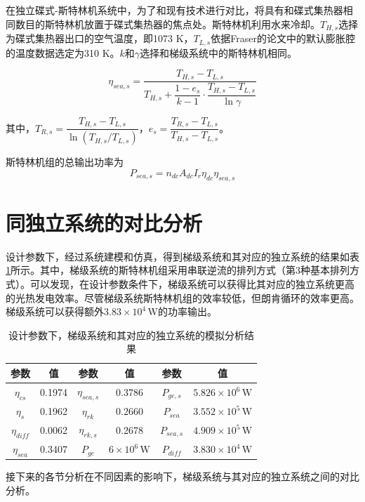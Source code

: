 在独立碟式-斯特林机系统中，为了和现有技术进行对比，将具有和碟式集热器相同数目的斯特林机放置于碟式集热器的焦点处。斯特林机利用水来冷却。$T_{H,s}$选择为碟式集热器出口的空气温度，即1073 K，$T_{L,s}$依据Fraser的论文\cite{Fraser2008}中的默认膨胀腔的温度数据选定为310 K。$k$和$\gamma$选择和梯级系统中的斯特林机相同。

\begin{equation}
	\eta_{sea,s}=\dfrac{T_{H,s}-T_{L,s}}{T_{H,s}+\dfrac{1-e_{s}}{k-1}\cdot\dfrac{T_{H,s}-T_{L,s}}{\ln\gamma}}
\end{equation}

其中，$T_{R,s}=\dfrac{T_{H,s}-T_{L,s}}{\ln(T_{H,s}/T_{L,s})}$，$e_{s}=\dfrac{T_{R,s}-T_{L,s}}{T_{H,s}-T_{L,s}}$。

斯特林机组的总输出功率为
\begin{equation}
	P_{sea,s}=n_{dc}A_{dc}I_r\eta_{dc}\eta_{sea,s}
\end{equation}

\section{同独立系统的对比分析}

设计参数下，经过系统建模和仿真，得到梯级系统和其对应的独立系统的结果如表\ref{tab:importantResults}所示。其中，梯级系统的斯特林机组采用串联逆流的排列方式（第3种基本排列方式）。可以发现，在设计参数条件下，梯级系统可以获得比其对应的独立系统更高的光热发电效率。尽管梯级系统斯特林机组的效率较低，但朗肯循环的效率更高。梯级系统可以获得额外$3.83\times10^4\,\mathrm{W}$的功率输出。

\begin{table}[htbp]
\setlength{\abovecaptionskip}{-10pt}
	\caption{设计参数下，梯级系统和其对应的独立系统的模拟分析结果}
	\begin{center}
	\begin{tabular}{cccccc}
		\toprule
		参数		&	值	&	参数		&	值	&	参数		&	值\\
		\midrule
		$\eta_{cs}$		&	0.1974	&	$\eta_{sea,s}$	&	0.3786	&	$P_{ge,s}$	&	$5.826\times10^6\,\mathrm{W}$\\
		$\eta_{s}$	&	0.1962	&	$\eta_{rk}$	&	0.2660	&	$P_{sea}$		&	$3.552\times10^5\,\mathrm{W}$\\
		$\eta_{diff}$		&	0.0062	&	$\eta_{rk,s}$	&	0.2678	&	$P_{sea,s}$	&	$4.909\times10^5\,\mathrm{W}$\\
		$\eta_{sea}$	&	0.3407	&	$P_{ge}$		&	$6\times10^6\,\mathrm{W}$	&	$P_{diff}$		&	$3.830\times10^4\,\mathrm{W}$\\
		\bottomrule
	\end{tabular}
	\end{center}
	\label{tab:importantResults}
\end{table}
接下来的各节分析在不同因素的影响下，梯级系统与其对应的独立系统之间的对比分析。
